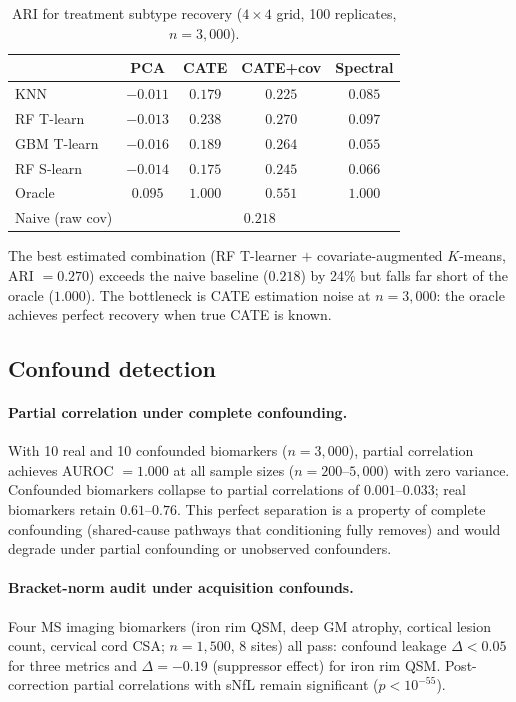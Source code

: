 \documentclass[11pt]{article}
\begin{document}
\begin{table}[t]
\centering
\caption{ARI for treatment subtype recovery ($4 \times 4$ grid, 100 replicates, $n = 3{,}000$).}
\label{tab:hte}
\small
\begin{tabular}{@{}lcccc@{}}
\toprule
 & \textbf{PCA} & \textbf{CATE} & \textbf{CATE+cov} & \textbf{Spectral} \\
\midrule
KNN       & $-0.011$ & $0.179$ & $0.225$ & $0.085$ \\
RF T-learn  & $-0.013$ & $0.238$ & $\mathbf{0.270}$ & $0.097$ \\
GBM T-learn & $-0.016$ & $0.189$ & $0.264$ & $0.055$ \\
RF S-learn  & $-0.014$ & $0.175$ & $0.245$ & $0.066$ \\
\midrule
Oracle        & $0.095$  & $1.000$ & $0.551$ & $1.000$ \\
Naive (raw cov) & \multicolumn{4}{c}{$0.218$} \\
\bottomrule
\end{tabular}
\end{table}

The best estimated combination (RF T-learner $+$ covariate-augmented $K$-means, ARI $= 0.270$) exceeds the naive baseline ($0.218$) by 24\% but falls far short of the oracle ($1.000$).
The bottleneck is CATE estimation noise at $n = 3{,}000$: the oracle achieves perfect recovery when true CATE is known.

\subsection{Confound detection}
\label{sec:res-confound}

\paragraph{Partial correlation under complete confounding.}
With 10 real and 10 confounded biomarkers ($n = 3{,}000$), partial correlation achieves AUROC $= 1.000$ at all sample sizes ($n = 200$--$5{,}000$) with zero variance.
Confounded biomarkers collapse to partial correlations of $0.001$--$0.033$; real biomarkers retain $0.61$--$0.76$.
This perfect separation is a property of complete confounding (shared-cause pathways that conditioning fully removes) and would degrade under partial confounding or unobserved confounders.

\paragraph{Bracket-norm audit under acquisition confounds.}
Four MS imaging biomarkers (iron rim QSM, deep GM atrophy, cortical lesion count, cervical cord CSA; $n = 1{,}500$, 8 sites) all pass: confound leakage $\Delta < 0.05$ for three metrics and $\Delta = -0.19$ (suppressor effect) for iron rim QSM.
Post-correction partial correlations with sNfL remain significant ($p < 10^{-55}$).
\end{document}
